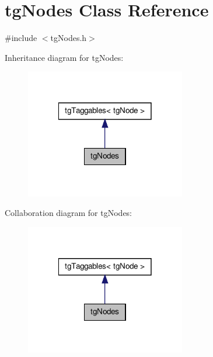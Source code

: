 \hypertarget{classtg_nodes}{\section{tg\-Nodes Class Reference}
\label{classtg_nodes}
}


{\ttfamily \#include $<$tg\-Nodes.\-h$>$}



Inheritance diagram for tg\-Nodes\-:\nopagebreak
\begin{figure}[H]
\begin{center}
\leavevmode
\includegraphics[width=198pt]{classtg_nodes__inherit__graph}
\end{center}
\end{figure}


Collaboration diagram for tg\-Nodes\-:\nopagebreak
\begin{figure}[H]
\begin{center}
\leavevmode
\includegraphics[width=198pt]{classtg_nodes__coll__graph}
\end{center}
\end{figure}
